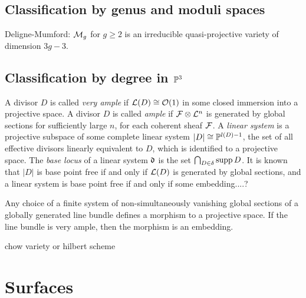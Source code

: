 \documentclass{../../large}
\begin{document}
\section{Classification by genus and moduli spaces}
Deligne-Mumford: $\cM_g$ for $g\ge2$ is an irreducible quasi-projective variety of dimension $3g-3$.

\section{Classification by degree in $\P^3$}

A divisor $D$ is called \emph{very ample} if $\cL(D)\cong\cO(1)$ in some closed immersion into a projective space.
A divisor $D$ is called \emph{ample} if $\cF\otimes\cL^n$ is generated by global sections for sufficiently large $n$, for each coherent sheaf $\cF$.
A \emph{linear system} is a projective subspace of some complete linear system $|D|\cong\P^{l(D)-1}$, the set of all effective divisors linearly equivalent to $D$, which is identified to a projective space.
The \emph{base locus} of a linear system $\fd$ is the set $\bigcap_{D\in\delta}\supp D$.
It is known that $|D|$ is base point free if and only if $\cL(D)$ is generated by global sections, and a linear system is base point free if and only if some embedding....?

Any choice of a finite system of non-simultaneously vanishing global sections of a globally generated line bundle defines a morphism to a projective space.
If the line bundle is very ample, then the morphism is an embedding.

chow variety or hilbert scheme


\chapter{Surfaces}
\end{document}
